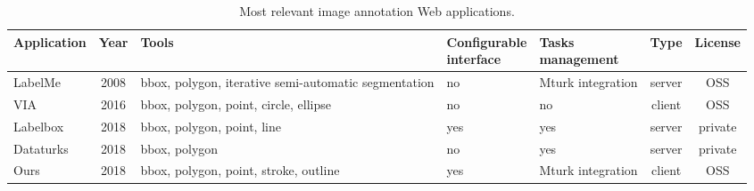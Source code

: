 \begin{table*}[ht]

\begin{tabular}{lclllcc}
Application
	& Year
    & Tools
    & \makecell[l]{Configurable\\interface}
    & \makecell[l]{Tasks\\management}
    & Type
    & License \\
    \midrule
LabelMe
	& 2008
    & bbox, polygon, iterative semi-automatic segmentation
    & no
    & Mturk integration
    & server
    & OSS \\
VIA
	& 2016
    & bbox, polygon, point, circle, ellipse
    & no
    & no
    & client
    & OSS \\
Labelbox
	& 2018
    & bbox, polygon, point, line
    & yes
    & yes
    & server
    & private \\
Dataturks
	& 2018
    & bbox, polygon
    & no
    & yes
    & server
    & private \\
Ours
	& 2018
    & bbox, polygon, point, stroke, outline
    & yes
    & Mturk integration
    & client
    & OSS \\
\end{tabular}

\caption{Most relevant image annotation Web applications.}%
\label{tab:web-apps}
\end{table*}